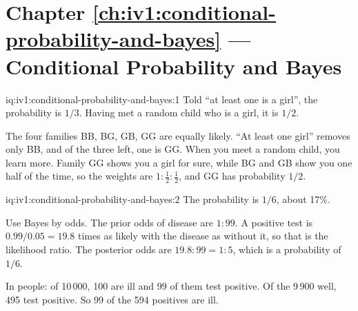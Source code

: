 \section*{Chapter \ref{ch:iv1:conditional-probability-and-bayes} --- Conditional Probability and Bayes}

\begin{solution}{iq:iv1:conditional-probability-and-bayes:1}
Told ``at least one is a girl'', the probability is $1/3$. Having met a random child who is a girl, it is $1/2$.

The four families BB, BG, GB, GG are equally likely. ``At least one girl'' removes only BB, and of the three left, one is GG. When you meet a random child, you learn more. Family GG shows you a girl for sure, while BG and GB show you one half of the time, so the weights are $1 : \tfrac12 : \tfrac12$, and GG has probability $1/2$.

\end{solution}

\enlargethispage{-3\baselineskip}%
\begin{solution}{iq:iv1:conditional-probability-and-bayes:2}
The probability is $1/6$, about 17\%.

Use Bayes by odds. The prior odds of disease are $1 : 99$. A positive test is $0.99/0.05 = 19.8$ times as likely with the disease as without it, so that is the likelihood ratio. The posterior odds are $19.8 : 99 = 1 : 5$, which is a probability of $1/6$.

In people: of 10\,000, 100 are ill and 99 of them test positive. Of the 9\,900 well, 495 test positive. So 99 of the 594 positives are ill.

\end{solution}

